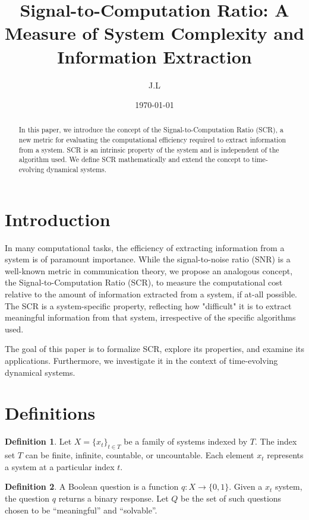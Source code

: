 \documentclass[11pt,a4paper]{article}
\title{Signal-to-Computation Ratio: A Measure of System Complexity and Information Extraction}
\author{J.L}
\date{\today}
\theoremstyle{definition}
\newtheorem{defn}{Definition}[section]
\theoremstyle{remark}
\numberwithin{equation}{section}
\begin{document}
\maketitle

\begin{abstract}
In this paper, we introduce the concept of the Signal-to-Computation Ratio (SCR), a new metric for evaluating the computational efficiency required to extract information from a system. SCR is an intrinsic property of the system and is independent of the algorithm used. We define SCR mathematically and extend the concept to time-evolving dynamical systems.
\end{abstract}

\section{Introduction}
In many computational tasks, the efficiency of extracting information from a system is of paramount importance. 
While the signal-to-noise ratio (SNR) is a well-known metric in communication theory, we propose an analogous concept, the Signal-to-Computation Ratio (SCR), to measure the computational cost relative to the amount of information extracted from a system, if at-all possible. 
The SCR is a system-specific property, reflecting how "difficult" it is to extract meaningful information from that system, irrespective of the specific algorithms used.

The goal of this paper is to formalize SCR, explore its properties, and examine its applications.
Furthermore, we investigate it  in the context of time-evolving dynamical systems. 



\section{Definitions}

\begin{defn}
Let \( X = \{x_t\}_{t \in T} \) be a family of systems indexed by \( T \).
The index set \( T \) can be finite, infinite, countable, or uncountable.
Each element \( x_t \) represents a system at a particular index \( t \).
\end{defn}

\begin{defn}
A Boolean question is a function \( q: X \rightarrow \{0, 1\} \).
Given a  \( x_t \) system, the question \( q \) returns a binary response.
Let $Q$ be the set of such questions chosen to be ``meaningful'' and ``solvable''. 
\end{defn}
\end{document}
